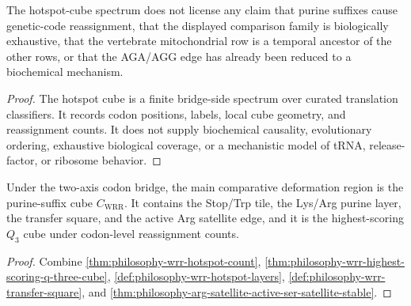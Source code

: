 \begin{theorem}
\label{thm:philosophy-wrr-hotspot-cannot-claim-boundary}
The hotspot-cube spectrum does not license any claim that purine suffixes
cause genetic-code reassignment, that the displayed comparison family is
biologically exhaustive, that the vertebrate mitochondrial row is a
temporal ancestor of the other rows, or that the AGA/AGG edge has already
been reduced to a biochemical mechanism.
\end{theorem}
\begin{proof}
The hotspot cube is a finite bridge-side spectrum over curated
translation classifiers. It records codon positions, labels, local cube
geometry, and reassignment counts. It does not supply biochemical
causality, evolutionary ordering, exhaustive biological coverage, or a
mechanistic model of tRNA, release-factor, or ribosome behavior.
\end{proof}

\begin{corollary}
\label{cor:philosophy-wrr-hotspot-allowed-claim}
Under the two-axis codon bridge, the main comparative deformation region
is the purine-suffix cube $C_{\mathrm{WRR}}$. It contains the Stop/Trp
tile, the Lys/Arg purine layer, the transfer square, and the active Arg
satellite edge, and it is the highest-scoring $Q_{3}$ cube under
codon-level reassignment counts.
\end{corollary}
\begin{proof}
Combine \autoref{thm:philosophy-wrr-hotspot-count},
\autoref{thm:philosophy-wrr-highest-scoring-q-three-cube},
\autoref{def:philosophy-wrr-hotspot-layers},
\autoref{def:philosophy-wrr-transfer-square}, and
\autoref{thm:philosophy-arg-satellite-active-ser-satellite-stable}.
\end{proof}
